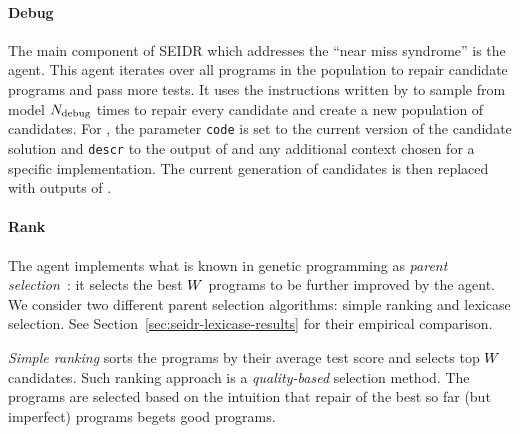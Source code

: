 \paragraph{Debug}

The main component of SEIDR which addresses the ``near miss syndrome'' is the \debug{} agent.  
This agent iterates over all programs in the population to repair candidate programs and pass more tests. 
It uses the instructions written by \instruct{} to sample from \debugmodel{} model $N_\text{debug}{}$ times
to repair every candidate and create a new population of \treearity{} candidates.
For \debugmodel{}, the parameter \texttt{code} is set to the current version of the candidate solution and \texttt{descr} to the output of \instruct{} and any additional context chosen for a specific implementation.
The current generation of candidates is then replaced with \treearity{} outputs of \debug{}.

\paragraph{Rank}

The \rank{} agent implements what is known in genetic programming as \emph{parent selection}~\cite{koza1994:genetic}: it selects the best $W{}$ programs to be further improved by the \debug{} agent.
We consider two different parent selection algorithms: simple ranking and lexicase selection. 
See Section~\ref{sec:seidr-lexicase-results} for their empirical comparison.

\emph{Simple ranking} sorts the programs by their average test score and selects top $W{}$ candidates. 
Such ranking approach is a \emph{quality-based} selection method.
The programs are selected based on the intuition that repair of the best so far (but imperfect) programs begets good programs.


